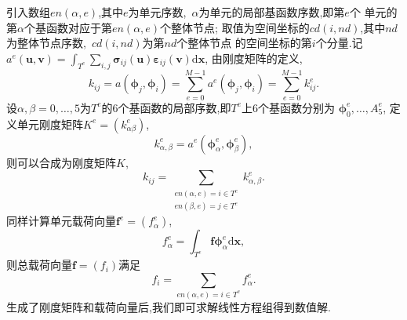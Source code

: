 \documentclass[a4paper, 11pt]{ctexart}
\newcommand\bu{\boldsymbol{u}}
\newcommand\bv{\boldsymbol{v}}
\newcommand\bx{\boldsymbol{x}}
\newcommand\dd{\mathrm{d}}
\newcommand\beps{\bm{\varepsilon}}
\newcommand\bsig{\bm{\sigma}}
\newcommand\bphi{\bm{\phi}}
\begin{document}
引入数组$en(\alpha,e)$,其中$e$为单元序数,~$\alpha$为单元的局部基函数序数,即第$e$个
单元的第$\alpha$个基函数对应于第$en(\alpha,e)$个整体节点;
取值为空间坐标的$cd(i,nd)$,其中$nd$为整体节点序数,~$cd(i,nd)$为第$nd$个整体节点
的空间坐标的第$i$个分量.记
$a^e(\bu,\bv)=\int_{T^e}\sum_{i,j}\bsig_{ij}(\bu)\beps_{ij}(\bv)\dd\bx$,
由刚度矩阵的定义,
\begin{equation}
  k_{ij}=a(\bphi_j,\bphi_i)=\sum_{e=0}^{M-1}a^e(\bphi_j,\bphi_i)=\sum_{e=0}^{M-1}k^e_{ij}.
\end{equation}
设$\alpha,\beta=0,\dots,5$为$T^e$的6个基函数的局部序数,即$T^e$上6个基函数分别为
$\bphi^e_0,\dots,A^e_5$,
定义单元刚度矩阵$K^e=(k^e_{\alpha\beta})$,
\begin{equation}
  k^e_{\alpha,\beta}=a^e(\bphi_\alpha^e,\bphi_\beta^e),
\end{equation}
则可以合成为刚度矩阵$K$,
\begin{equation}
  k_{ij}=\sum_{\substack{en(\alpha,e)=i\in T^e\\en(\beta,e)=j\in T^e}} k_{\alpha,\beta}^e.
\end{equation}
同样计算单元载荷向量$\boldsymbol{f}^e=(f^e_\alpha)$,
\begin{equation}
  f^e_\alpha=\int_{T^e}\boldsymbol{f}\bphi_\alpha^e\dd\bx,
\end{equation}
则总载荷向量$\boldsymbol{f}=(f_i)$满足
\begin{equation}
  f_i=\sum\limits_{en(\alpha,e)=i\in T^e}f^e_\alpha.
\end{equation}
生成了刚度矩阵和载荷向量后,我们即可求解线性方程组得到数值解.
\end{document}
